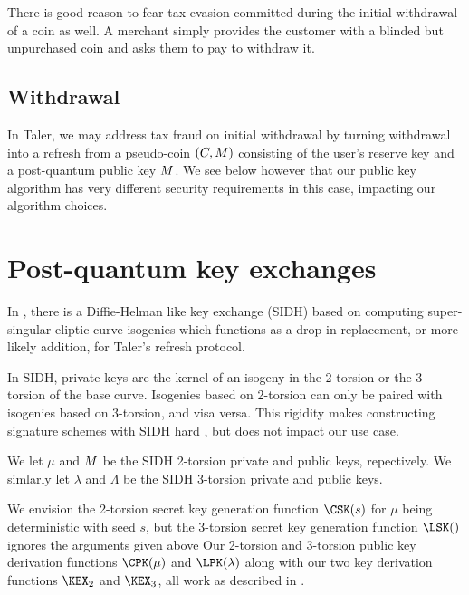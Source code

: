 \documentclass{llncs}
\begin{document}
\smallskip

There is good reason to fear tax evasion committed during the
initial withdrawal of a coin as well.  A merchant simply provides
the customer with a blinded but unpurchased coin and asks them to
pay to withdraw it.

\subsection{Withdrawal}\label{subsec:withdrawal}

In Taler, we may address tax fraud on initial withdrawal by turning
withdrawal into a refresh from a pseudo-coin $(C,M)$ consisting of
 the user's reserve key \cite[??]{Taler} and
 a post-quantum public key $M$.
We see below however that our public key algorithm has very different
security requirements in this case, impacting our algorithm choices.


\section{Post-quantum key exchanges}

In \cite{SIDH?,SIDH16}, there is a Diffie-Helman like key exchange
(SIDH) based on computing super-singular eliptic curve isogenies 
which functions as a drop in replacement, or more likely addition,
for Taler's refresh protocol.

In SIDH, private keys are the kernel of an isogeny in the 2-torsion
or the 3-torsion of the base curve.  Isogenies based on 2-torsion can
only be paired with isogenies based on 3-torsion, and visa versa.  
This rigidity makes constructing signature schemes with SIDH hard
\cite{}, but does not impact our use case.  

We let $\mu$ and $M$ be the SIDH 2-torsion private and public keys,
repectively.  We simlarly let $\lambda$ and $\Lambda$ be the
SIDH 3-torsion private and public keys.  

We envision the 2-torsion secret key generation function $\CSK(s)$
for $\mu$ being deterministic with seed $s$, but the 3-torsion secret
key generation function $\LSK()$ ignores the arguments given above 
Our 2-torsion and 3-torsion public key derivation functions
$\CPK(\mu)$ and $\LPK(\lambda)$ along with our two key derivation
functions $\KEX_2$ and $\KEX_3$, all work as described in
\cite[\S6]{SIDH16}.

\end{document}
